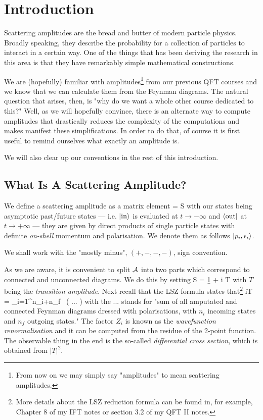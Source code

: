 \chapter{Introduction}

Scattering amplitudes are the bread and butter of modern particle physics. Broadly speaking, they describe the probability for a collection of particles to interact in a certain way. One of the things that has been deriving the research in this area is that they have remarkably simple mathematical constructions. 

We are (hopefully) familiar with amplitudes\footnote{From now on we may simply say "amplitudes" to mean scattering amplitudes.} from our previous QFT courses and we know that we can calculate them from the Feynman diagrams. The natural question that arises, then, is "why do we want a whole other course dedicated to this?" Well, as we will hopefully convince, there is an alternate way to compute amplitudes that drastically reduces the complexity of the computations and makes manifest these simplifications. In order to do that, of course it is first useful to remind ourselves what exactly an amplitude is. 

We will also clear up our conventions in the rest of this introduction. 

\section{What Is A Scattering Amplitude?}

\bd 
    We define a scattering amplitude as a matrix element 
    \be 
    \label{eqn:Amplitude}
        \cA =  S 
    \ee 
    with our states being asymptotic past/future states --- i.e. $\ket{\text{in}}$ is evaluated at $t\to -\infty$ and $\bra{\text{out}}$ at $t\to +\infty$ --- they are given by direct products of single particle states with definite \textit{on-shell} momentum and polarisation. We denote them as follows $\ket{p_i,\epsilon_i}$. 
\ed 

\br  
    We shall work with the "mostly minus", $(+,-,-,-)$, sign convention. 
\er 

As we are aware, it is convenient to split $\mathcal{A}$ into two parts which correspond to connected and unconnected diagrams. We do this by setting 
\bse
    S = \b1 + i T
\ese 
with $T$ being the \textit{transition amplitude}. Next recall that the LSZ formula states that\footnote{More details about the LSZ reduction formula can be found in, for example, Chapter 8 of my IFT notes or section 3.2 of my QFT II notes.} 
\bse 
     iT  = \prod_{i=1}^{n_i+n_f}  \, ( ... )
\ese 
with the $...$ stands for "sum of all amputated and connected Feynman diagrams dressed with polarisations, with $n_i$ incoming states and $n_f$ outgoing states." The factor $Z_i$ is known as the \textit{wavefunction renormalisation} and it can be computed from the residue of the 2-point function. The observable thing in the end is the so-called \textit{differential cross section}, which is obtained from $|T|^2$. 

